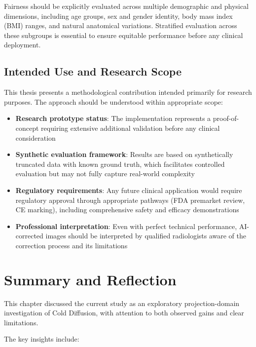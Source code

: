 Fairness should be explicitly evaluated across multiple demographic and physical dimensions, including age groups, sex and gender identity, body mass index (BMI) ranges, and natural anatomical variations. Stratified evaluation across these subgroups is essential to ensure equitable performance before any clinical deployment.

\subsection{Intended Use and Research Scope}

This thesis presents a methodological contribution intended primarily for research purposes. The approach should be understood within appropriate scope:

\begin{itemize}
    \item \textbf{Research prototype status}: The implementation represents a proof-of-concept requiring extensive additional validation before any clinical consideration
    \item \textbf{Synthetic evaluation framework}: Results are based on synthetically truncated data with known ground truth, which facilitates controlled evaluation but may not fully capture real-world complexity
    \item \textbf{Regulatory requirements}: Any future clinical application would require regulatory approval through appropriate pathways (FDA premarket review, CE marking), including comprehensive safety and efficacy demonstrations
    \item \textbf{Professional interpretation}: Even with perfect technical performance, AI-corrected images should be interpreted by qualified radiologists aware of the correction process and its limitations
\end{itemize}

\section{Summary and Reflection}

This chapter discussed the current study as an exploratory projection-domain investigation of Cold Diffusion, with attention to both observed gains and clear limitations.

The key insights include:

